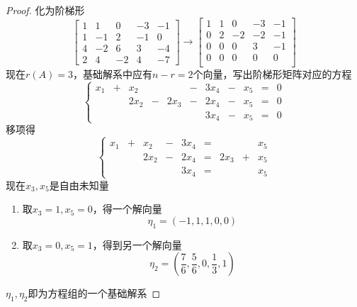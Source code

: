 \documentclass[11pt]{article}
\begin{document}
\begin{proof}
化为阶梯形
\begin{equation*}
\begin{bmatrix}
1&1&0&-3&-1\\
1&-1&2&-1&0\\
4&-2&6&3&-4\\
2&4&-2&4&-7
\end{bmatrix}\to
\begin{bmatrix}
1&1&0&-3&-1\\
0&2&-2&-2&-1\\
0&0&0&3&-1\\
0&0&0&0&0\\
\end{bmatrix}
\end{equation*}
现在\(r(A)=3\)，基础解系中应有\(n-r=2\)个向量，写出阶梯形矩阵对应的方程
\begin{equation*}
\left\{
\begin{array}{ccccccccccc}
x_1&+&x_2&&&-&3x_4&-&x_5&=&0\\
&&2x_2&-&2x_3&-&2x_4&-&x_5&=&0\\
&&&&&&3x_4&-&x_5&=&0
\end{array}
\right.
\end{equation*}
移项得
\begin{equation*}
\left\{\begin{array}{ccccccccc}
x_1&+&x_2&-&3x_4&=&&&x_5\\
&&2x_2&-&2x_4&=&2x_3&+&x_5\\
&&&&3x_4&=&&&x_5
\end{array}\right.
\end{equation*}
现在\(x_3,x_5\)是自由未知量
\begin{enumerate}
\item 取\(x_3=1,x_5=0\)，得一个解向量
\begin{equation*}
\eta_1=(-1,1,1,0,0)
\end{equation*}
\item 取\(x_3=0,x_5=1\)，得到另一个解向量
\begin{equation*}
\eta_2=(\frac{7}{6},\frac{5}{6},0,\frac{1}{3},1)
\end{equation*}
\end{enumerate}


\(\eta_1,\eta_2\)即为方程组的一个基础解系
\end{proof}
\end{document}
